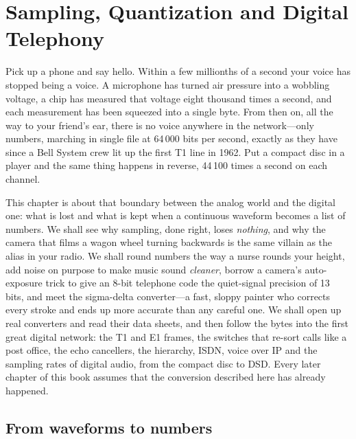\chapter{Sampling, Quantization and Digital Telephony}
\label{ch:pcm}

\begin{chapterintro}
Pick up a phone and say hello. Within a few millionths of a second your voice has stopped being a
voice. A microphone has turned air pressure into a wobbling voltage, a chip has measured that
voltage eight thousand times a second, and each measurement has been squeezed into a single
byte. From then on, all the way to your friend's ear, there is no voice anywhere in the
network---only numbers, marching in single file at 64\,000 bits per second, exactly as they
have since a Bell System crew lit up the first T1 line in 1962. Put a compact disc in a player and
the same thing happens in reverse, 44\,100 times a second on each channel.

This chapter is about that boundary between the analog world and the digital one: what is lost
and what is kept when a continuous waveform becomes a list of numbers. We shall see why
sampling, done right, loses \emph{nothing}, and why the camera that films a wagon wheel turning
backwards is the same villain as the alias in your radio. We shall round numbers the way a
nurse rounds your height, add noise on purpose to make music sound \emph{cleaner}, borrow a
camera's auto-exposure trick to give an 8-bit telephone code the quiet-signal precision of 13
bits, and meet the sigma-delta converter---a fast, sloppy painter who corrects every stroke and
ends up more accurate than any careful one. We shall open up real converters and read their data
sheets, and then follow the bytes into the first great digital network: the T1 and E1 frames,
the switches that re-sort calls like a post office, the echo cancellers, the hierarchy, ISDN,
voice over IP and the sampling rates of digital audio, from the compact disc to DSD. Every later
chapter of this book assumes that the conversion described here has already happened.
\end{chapterintro}

\section{From waveforms to numbers}
\label{sec:ch05:intro}

